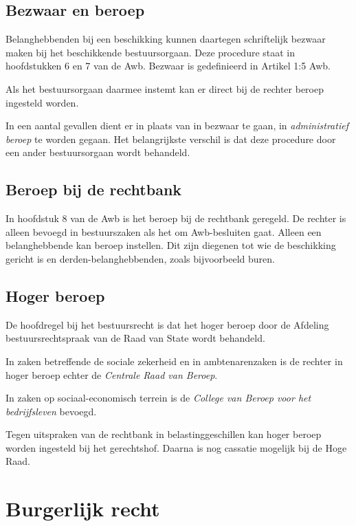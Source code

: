 \documentclass{article}
\begin{document}
\subsection{Bezwaar en beroep}

Belanghebbenden bij een beschikking kunnen daartegen schriftelijk bezwaar maken
bij het beschikkende bestuursorgaan. Deze procedure staat in hoofdstukken 6 en
7 van de Awb. Bezwaar is gedefinieerd in Artikel 1:5 Awb.

Als het bestuursorgaan daarmee instemt kan er direct bij de rechter beroep
ingesteld worden.

In een aantal gevallen dient er in plaats van in bezwaar te gaan, in
\emph{administratief beroep} te worden gegaan. Het belangrijkste verschil is
dat deze procedure door een ander bestuursorgaan wordt behandeld.

\subsection{Beroep bij de rechtbank}

In hoofdstuk 8 van de Awb is het beroep bij de rechtbank geregeld. De rechter
is alleen bevoegd in bestuurszaken als het om Awb-besluiten gaat. Alleen een
belanghebbende kan beroep instellen. Dit zijn diegenen tot wie de beschikking
gericht is en derden-belanghebbenden, zoals bijvoorbeeld buren.

\subsection{Hoger beroep}

De hoofdregel bij het bestuursrecht is dat het hoger beroep door de Afdeling
bestuursrechtspraak van de Raad van State wordt behandeld.

In zaken betreffende de sociale zekerheid en in ambtenarenzaken is de rechter
in hoger beroep echter de \emph{Centrale Raad van Beroep}.

In zaken op sociaal-economisch terrein is de \emph{College van Beroep voor het
bedrijfsleven} bevoegd.

Tegen uitspraken van de rechtbank in belastinggeschillen kan hoger beroep
worden ingesteld bij het gerechtshof. Daarna is nog cassatie mogelijk bij de
Hoge Raad.




\section{Burgerlijk recht}
\end{document}
